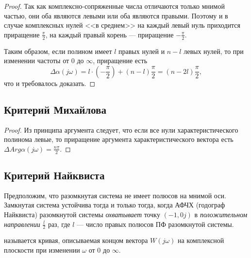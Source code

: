 \documentclass[../../TAU.tex]{subfiles}
\begin{document}
\begin{proof}
        Так как комплексно-сопряженные числа отличаются только мнимой частью, они оба являются левыми или оба являются правыми.
        Поэтому и в случае комплексных нулей <<в среднем>> на каждый левый нуль приходится приращение $\frac{\pi}{2}$, на каждый правый корень --- приращение {$-\frac{\pi}{2}$}.\par
        Таким образом, если полином имеет $l$ правых нулей и $n-l$ левых нулей, то при изменении частоты от $0$ до $\infty$, приращение есть
        $$
            \Delta \alpha(j \omega) = l\cdot(-\frac{\pi}{2})+(n-l)\frac{\pi}{2} = (n-2 l)\frac{\pi}{2},
        $$
        что и требовалось доказать.
    \end{proof}

\subsection{Критерий Михайлова}


    \begin{proof}
        Из принципа аргумента следует, что если все нули характеристического полинома левые, то приращение аргумента характеристического вектора есть $\Delta Arg \alpha(j \omega)=\frac{n \pi}{2}$.
    \end{proof}

\subsection{Критерий Найквиста}

    \theor[Найквист] Предположим, что разомкнутая система не имеет полюсов на мнимой оси.
    Замкнутая система устойчива тогда и только тогда, когда АФЧХ (годограф Найквиста) разомкнутой системы {\it охватывает} точку $(-1, 0j)$ в {\it положительном направлении} $\frac{l}{2}$ раз, где $l$ --- число правых полюсов ПФ разомкнутой системы.

     называется кривая, описываемая концом вектора $W(j\omega)$ на комплексной плоскости при изменении $\omega$ от $0$ до $\infty$.
\end{document}
